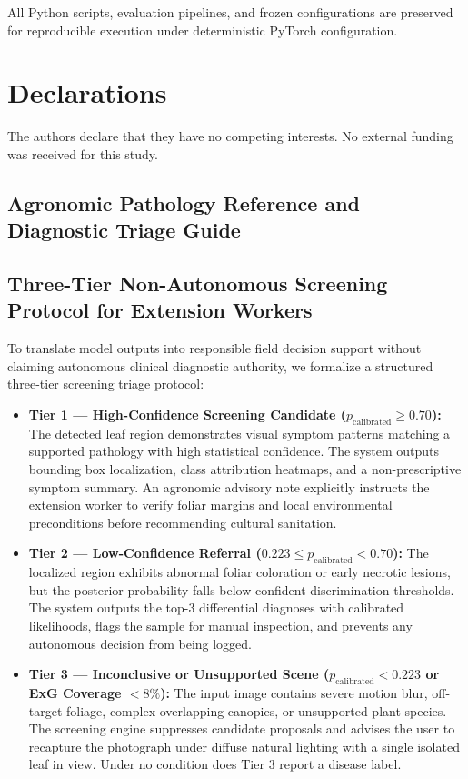 \documentclass[pdflatex,sn-mathphys-num]{sn-jnl}
\theoremstyle{thmstyleone}%
\theoremstyle{thmstyletwo}%
\theoremstyle{thmstylethree}%
\begin{document}
All Python scripts, evaluation pipelines, and frozen configurations are preserved for reproducible execution under deterministic PyTorch configuration.

\section*{Declarations}
The authors declare that they have no competing interests. No external funding was received for this study.


\begin{appendices}

\section{Agronomic Pathology Reference and Diagnostic Triage Guide}
\label{sec:appendix_e}

\subsection{Three-Tier Non-Autonomous Screening Protocol for Extension Workers}
To translate model outputs into responsible field decision support without claiming autonomous clinical diagnostic authority, we formalize a structured three-tier screening triage protocol:

\begin{itemize}
  \item \textbf{Tier 1 --- High-Confidence Screening Candidate ($p_{\text{calibrated}} \ge 0.70$):} The detected leaf region demonstrates visual symptom patterns matching a supported pathology with high statistical confidence. The system outputs bounding box localization, class attribution heatmaps, and a non-prescriptive symptom summary. An agronomic advisory note explicitly instructs the extension worker to verify foliar margins and local environmental preconditions before recommending cultural sanitation.
  \item \textbf{Tier 2 --- Low-Confidence Referral ($0.223 \le p_{\text{calibrated}} < 0.70$):} The localized region exhibits abnormal foliar coloration or early necrotic lesions, but the posterior probability falls below confident discrimination thresholds. The system outputs the top-3 differential diagnoses with calibrated likelihoods, flags the sample for manual inspection, and prevents any autonomous decision from being logged.
  \item \textbf{Tier 3 --- Inconclusive or Unsupported Scene ($p_{\text{calibrated}} < 0.223$ or ExG Coverage $< 8\%$):} The input image contains severe motion blur, off-target foliage, complex overlapping canopies, or unsupported plant species. The screening engine suppresses candidate proposals and advises the user to recapture the photograph under diffuse natural lighting with a single isolated leaf in view. Under no condition does Tier 3 report a disease label.
\end{itemize}


\end{appendices}
\end{document}
